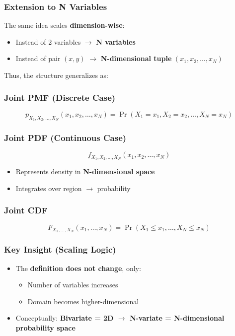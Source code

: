\documentclass[11pt]{article}
\begin{document}
\subsubsection*{Extension to N Variables}

The same idea scales \textbf{dimension-wise}:

\begin{itemize}
\item Instead of 2 variables $\rightarrow$ \textbf{N variables}
\item Instead of pair $(x,y)$ $\rightarrow$ \textbf{N-dimensional tuple} $(x_1, x_2, \dots, x_N)$
\end{itemize}

Thus, the structure generalizes as:

\subsubsection*{Joint PMF (Discrete Case)}

\[
p_{X_1, X_2, \dots, X_N}(x_1, x_2, \dots, x_N)
= \Pr(X_1 = x_1, X_2 = x_2, \dots, X_N = x_N)
\]

\subsubsection*{Joint PDF (Continuous Case)}

\[
f_{X_1, X_2, \dots, X_N}(x_1, x_2, \dots, x_N)
\]

\begin{itemize}
\item Represents density in \textbf{N-dimensional space}
\item Integrates over region $\rightarrow$ probability
\end{itemize}

\subsubsection*{Joint CDF}

\[
F_{X_1, \dots, X_N}(x_1, \dots, x_N)
= \Pr(X_1 \le x_1, \dots, X_N \le x_N)
\]

\subsubsection*{Key Insight (Scaling Logic)}

\begin{itemize}
\item The \textbf{definition does not change}, only:
\begin{itemize}
\item Number of variables increases
\item Domain becomes higher-dimensional
\end{itemize}
\item Conceptually: \textbf{Bivariate = 2D $\rightarrow$ N-variate = N-dimensional probability space}
\end{itemize}
\end{document}

